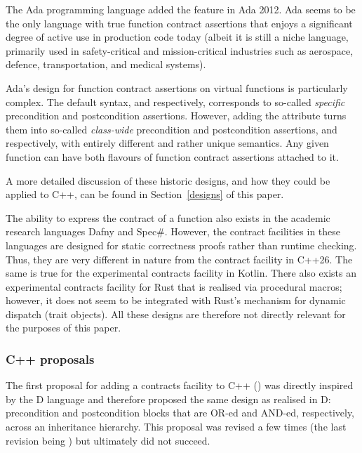 The Ada programming language added the feature in Ada 2012. Ada seems to be the only language with true function contract assertions that enjoys a significant degree of active use in production code today (albeit it is still a niche language, primarily used in safety-critical and mission-critical industries such as aerospace, defence, transportation, and medical systems).

Ada's design for function contract assertions on virtual functions is particularly complex. The default syntax,  and  respectively, corresponds to so-called \emph{specific} precondition and postcondition assertions. However, adding the  attribute turns them into so-called  \emph{class-wide} precondition and postcondition assertions,  and  respectively, with entirely different and rather unique semantics. Any given function can have both flavours of function contract assertions attached to it.

A more detailed discussion of these historic designs, and how they could be applied to C++, can be found in Section~\ref{designs} of this paper.

The ability to express the contract of a function also exists in the academic research languages Dafny and Spec\#. However, the contract facilities in these languages are designed for static correctness proofs rather than runtime checking. Thus, they are very different in nature from the contract facility in C++26. The same is true for the experimental contracts facility in Kotlin. There also exists an experimental contracts facility for Rust that is realised via procedural macros; however, it does not seem to be integrated with Rust's mechanism for dynamic dispatch (trait objects). All these designs are therefore not directly relevant for the purposes of this paper.

\subsubsection{C++ proposals}

The first proposal for adding a contracts facility to C++ (\cite{N1613}) was directly inspired by the D language and therefore proposed the same design as realised in D: precondition and postcondition blocks that are OR-ed and AND-ed, respectively, across an inheritance hierarchy. This proposal was revised a few times (the last revision being \cite{N1962}) but ultimately did not succeed.

